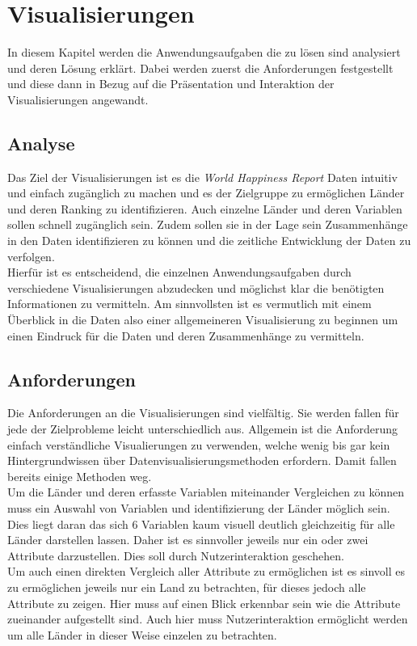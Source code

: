 \section{Visualisierungen}
In diesem Kapitel werden die Anwendungsaufgaben die zu lösen sind analysiert und deren Lösung erklärt. Dabei werden zuerst die Anforderungen festgestellt und diese dann in Bezug auf die Präsentation und Interaktion der Visualisierungen angewandt.  

\subsection{Analyse}

Das Ziel der Visualisierungen ist es die \textit{World Happiness Report} Daten intuitiv und einfach zugänglich zu machen und es der Zielgruppe zu ermöglichen Länder und deren Ranking zu identifizieren. Auch einzelne Länder und deren Variablen sollen schnell zugänglich sein. Zudem sollen sie in der Lage sein Zusammenhänge in den Daten identifizieren zu können und die zeitliche Entwicklung der Daten zu verfolgen. \\

Hierfür ist es entscheidend, die einzelnen Anwendungsaufgaben durch verschiedene Visualisierungen abzudecken und möglichst klar die benötigten Informationen zu vermitteln. 
Am sinnvollsten ist es vermutlich mit einem Überblick in die Daten also einer allgemeineren Visualisierung zu beginnen um einen Eindruck für die Daten und deren Zusammenhänge zu vermitteln. \\

\subsection{Anforderungen}
Die Anforderungen an die Visualisierungen sind vielfältig. Sie werden fallen für jede der Zielprobleme leicht unterschiedlich aus. Allgemein ist die Anforderung einfach verständliche Visualierungen zu verwenden, welche wenig bis gar kein Hintergrundwissen über Datenvisualisierungsmethoden erfordern. Damit fallen bereits einige Methoden weg. \\

Um die Länder und deren erfasste Variablen miteinander Vergleichen zu können muss ein Auswahl von Variablen und identifizierung der Länder möglich sein. Dies liegt daran das sich 6 Variablen kaum visuell deutlich gleichzeitig für alle Länder darstellen lassen. Daher ist es sinnvoller jeweils nur ein oder zwei Attribute darzustellen. Dies soll durch Nutzerinteraktion geschehen. \\

Um auch einen direkten Vergleich aller Attribute zu ermöglichen ist es sinvoll es zu ermöglichen jeweils nur ein Land zu betrachten, für dieses jedoch alle Attribute zu zeigen. Hier muss auf einen Blick erkennbar sein wie die Attribute zueinander aufgestellt sind. Auch hier muss Nutzerinteraktion ermöglicht werden um alle Länder in dieser Weise einzelen zu betrachten. \\

